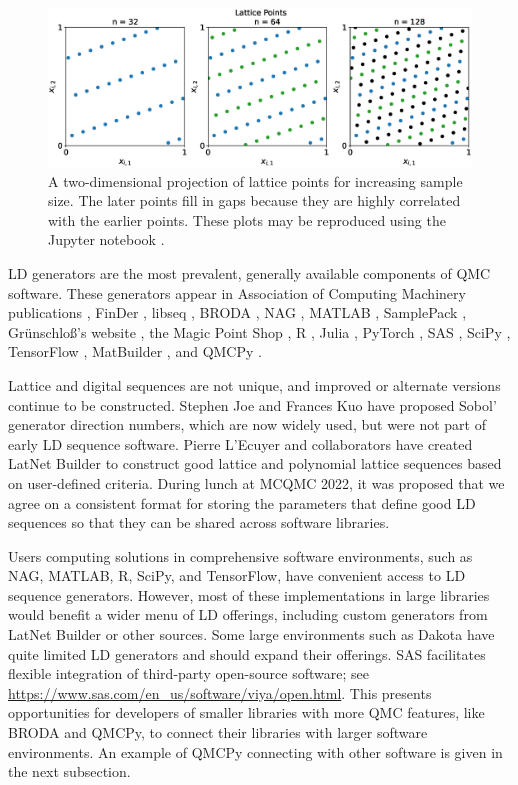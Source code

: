 \documentclass[graybox]{svmult}
\begin{document}
\begin{figure}[t]
    \centering
    \includegraphics[width=\textwidth]{latticepts.eps}
    \caption{A two-dimensional projection of lattice points for increasing sample size.  The later points fill in gaps because they are highly correlated with the earlier points.  These plots may be reproduced using the Jupyter notebook \cite{MCQMC2022Figs}. }
    \label{CDHJSfiglatticepts}
\end{figure}

LD generators are the most prevalent, generally available components of QMC software.  These generators appear in Association of Computing Machinery  publications \cite{BraFox88,BraFoxNie92,HonHic00a}, FinDer \cite{PasTra95,FinDer}, libseq \cite{FriKel02,FriKelweb}, BRODA \cite{BRODA20a}, NAG \cite{NAG27}, MATLAB \cite{MAT9.13}, SamplePack \cite{SamplePack}, Gr\"unschlo{\ss}'s website \cite{GruWeb}, the Magic Point Shop \cite{NuyWeb}, R \cite{QRNG2020}, Julia \cite{QMCJulia}, PyTorch \cite{paszke2019pytorch}, SAS \cite{SAS_LD}, SciPy \cite{virtanen2020scipy},  TensorFlow \cite{tfqfQMC2021a}, MatBuilder \cite{paulin2022}, and  QMCPy \cite{QMCPy2020a}.

Lattice and digital sequences are not unique, and improved or alternate versions continue to be constructed.  Stephen Joe and Frances Kuo \cite{JoeKuo03,KuoJoe08a,SobolDirection} have proposed  Sobol' generator direction numbers, which are now widely used, but were not part of early LD sequence software.  Pierre L'Ecuyer and collaborators have created LatNet Builder \cite{LEcEtal22a} to construct good lattice and polynomial lattice sequences based on user-defined criteria. During lunch at MCQMC 2022, it was proposed that we  agree on a consistent format for storing the parameters that define good LD sequences so that they can be shared across software libraries.

Users computing solutions in comprehensive software environments, such as NAG, MATLAB, R, SciPy, and TensorFlow, have convenient access to LD sequence generators.  However, most of these implementations in large libraries would benefit a wider menu of LD offerings, including custom generators from LatNet Builder or other sources.  Some large environments such as  Dakota \cite{DakotaUsersManual} have quite limited LD generators and should expand their offerings. SAS facilitates flexible integration of third-party open-source software; see \href{https://www.sas.com/en_us/software/viya/open.html}{\url{https://www.sas.com/en_us/software/viya/open.html}}.
This presents opportunities for developers of smaller libraries with more QMC features, like BRODA and QMCPy, to connect their libraries with larger software environments. An example of QMCPy connecting with other software is given in the next subsection.
\end{document}
